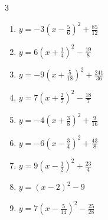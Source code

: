 \begin{multicols}{3}
\begin{enumerate}

\columnbreak %

  \item $\displaystyle y=-3\left( x-\frac{5}{6}\right)^{2}+\frac{85}{12}$


  \item $\displaystyle y=6\left( x+\frac{1}{4}\right)^{2}-\frac{19}{8}$


  \item $\displaystyle y=-9\left( x+\frac{5}{18}\right)^{2}+\frac{241}{36}$


  \item $\displaystyle y=7\left( x+\frac{2}{7}\right)^{2}-\frac{18}{7}$


  \item $\displaystyle y=-4\left( x+\frac{3}{8}\right)^{2}+\frac{9}{16}$


  \item $\displaystyle y=-6\left( x-\frac{3}{4}\right)^{2}+\frac{43}{8}$


  \item $\displaystyle y=9\left( x-\frac{1}{2}\right)^{2}+\frac{23}{4}$


  \item $\displaystyle y=\left( x-2\right)^{2}-9$

        \phantom{$\displaystyle 頂点\left( 2 , -9 \right)$}

  \item $\displaystyle y=7\left( x-\frac{5}{14}\right)^{2}-\frac{25}{28}$



\end{enumerate}
\end{multicols}
